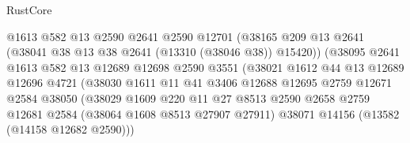 \begin{lexlean}{RustCore}
\begin{coremodule}
                                    @1613
                                    @582
                                    @13
                                    @2590
                                    @2641
                                    @2590
                                    @12701
                                    (@38165
                                      @209
                                      @13
                                      @2641
                                      (@38041 @38 @13 @38 @2641 (@13310 (@38046 @38)) @15420))
                                    (@38095
                                      @2641
                                      @1613
                                      @582
                                      @13
                                      @12689
                                      @12698
                                      @2590
                                      @3551
                                      (@38021
                                        @1612
                                        @44
                                        @13
                                        @12689
                                        @12696
                                        @4721
                                        (@38030
                                          @1611
                                          @11
                                          @41
                                          @3406
                                          @12688
                                          @12695
                                          @2759
                                          @12671
                                          @2584
                                          @38050
                                          (@38029
                                            @1609
                                            @220
                                            @11
                                            @27
                                            @8513
                                            @2590
                                            @2658
                                            @2759
                                            @12681
                                            @2584
                                            (@38064 @1608 @8513 @27907 @27911)
                                            @38071
                                            @14156
                                            (@13582 (@14158 @12682 @2590)))

\end{coremodule}
\end{lexlean}
